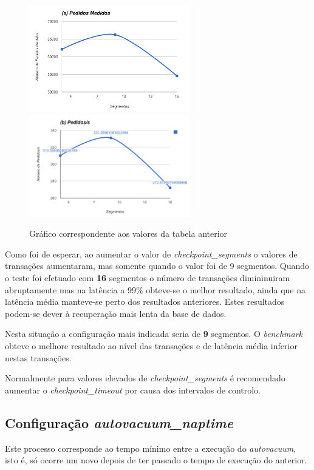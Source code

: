 \begin{figure}[ht!]
\centering
\includegraphics[width=70mm]{img/03_cs_a.png}
\includegraphics[width=70mm]{img/03_cs_b.png}
\caption{Gráfico correspondente aos valores da tabela anterior\label{overflow}}
\end{figure}

Como foi de esperar, ao aumentar o valor de \textit{checkpoint\_segments} o valores de transações aumentaram, mas somente quando o valor foi de 9 segmentos. Quando o teste foi efetuado com \textbf{16} segmentos o número de transações dimininuiram abruptamente mas na latência a 99\% obteve-se o melhor resultado, ainda que na latência média manteve-se perto dos resultados anteriores. Estes resultados podem-se dever à recuperação mais lenta da base de dados.

Nesta situação a configuração mais indicada seria de \textbf{9} segmentos. O \textit{benchmark} obteve o melhore resultado ao nível das transações e de latência média inferior nestas transações.

Normalmente para valores elevados de \textit{checkpoint\_segments} é recomendado aumentar o \textit{checkpoint\_timeout} por causa dos intervalos de controlo.

\newpage

\subsection{Configuração \textit{autovacuum\_naptime}}

Este processo corresponde ao tempo mínimo entre a execução do \textit{autovacuum}, isto é, só ocorre um novo depois de ter passado o tempo de execução do anterior.

